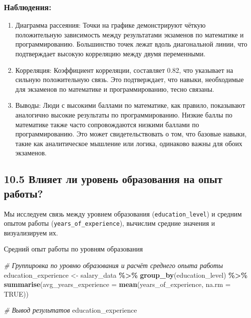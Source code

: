 \documentclass[
]{article}
\newenvironment{Shaded}{\begin{snugshade}}{\end{snugshade}}
\newcommand{\AttributeTok}[1]{\textcolor[rgb]{0.13,0.29,0.53}{#1}}
\newcommand{\CommentTok}[1]{\textcolor[rgb]{0.56,0.35,0.01}{\textit{#1}}}
\newcommand{\ConstantTok}[1]{\textcolor[rgb]{0.56,0.35,0.01}{#1}}
\newcommand{\FunctionTok}[1]{\textcolor[rgb]{0.13,0.29,0.53}{\textbf{#1}}}
\newcommand{\NormalTok}[1]{#1}
\newcommand{\OtherTok}[1]{\textcolor[rgb]{0.56,0.35,0.01}{#1}}
\newcommand{\SpecialCharTok}[1]{\textcolor[rgb]{0.81,0.36,0.00}{\textbf{#1}}}
\begin{document}
\subsubsection{Наблюдения:}\label{ux43dux430ux431ux43bux44eux434ux435ux43dux438ux44f-11}

\begin{enumerate}
\def\labelenumi{\arabic{enumi}.}
\item
  Диаграмма рассеяния: Точки на графике демонстрируют чёткую
  положительную зависимость между результатами экзаменов по математике и
  программированию. Большинство точек лежат вдоль диагональной линии,
  что подтверждает высокую корреляцию между двумя переменными.
\item
  Корреляция: Коэффициент корреляции, составляет 0.82, что указывает на
  сильную положительную связь. Это подтверждает, что навыки, необходимые
  для экзаменов по математике и программированию, тесно связаны.
\item
  Выводы: Люди с высокими баллами по математике, как правило, показывают
  аналогично высокие результаты по программированию. Низкие баллы по
  математике также часто сопровождаются низкими баллами по
  программированию. Это может свидетельствовать о том, что базовые
  навыки, такие как аналитическое мышление или логика, одинаково важны
  для обоих экзаменов.
\end{enumerate}

\subsection{10.5 Влияет ли уровень образования на опыт
работы?}\label{ux432ux43bux438ux44fux435ux442-ux43bux438-ux443ux440ux43eux432ux435ux43dux44c-ux43eux431ux440ux430ux437ux43eux432ux430ux43dux438ux44f-ux43dux430-ux43eux43fux44bux442-ux440ux430ux431ux43eux442ux44b}

Мы исследуем связь между уровнем образования (\texttt{education\_level})
и средним опытом работы (\texttt{years\_of\_experience}), вычислим
средние значения и визуализируем их.

Средний опыт работы по уровням образования

\begin{Shaded}
\begin{Highlighting}[]
\CommentTok{\# Группировка по уровню образования и расчёт среднего опыта работы}
\NormalTok{education\_experience }\OtherTok{\textless{}{-}}\NormalTok{ salary\_data }\SpecialCharTok{\%\textgreater{}\%}
  \FunctionTok{group\_by}\NormalTok{(education\_level) }\SpecialCharTok{\%\textgreater{}\%}
  \FunctionTok{summarise}\NormalTok{(}\AttributeTok{avg\_years\_experience =} \FunctionTok{mean}\NormalTok{(years\_of\_experience, }\AttributeTok{na.rm =} \ConstantTok{TRUE}\NormalTok{))}

\CommentTok{\# Вывод результатов}
\NormalTok{education\_experience}
\end{Highlighting}
\end{Shaded}
\end{document}
